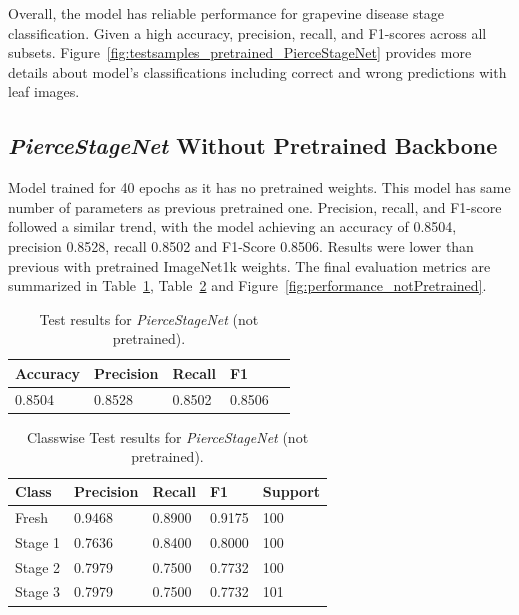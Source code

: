 \documentclass[conference]{IEEEtran}
\begin{document}
Overall, the model has reliable performance for grapevine disease stage classification. Given a high accuracy, precision, recall, and F1-scores across all subsets. Figure~\ref{fig:testsamples_pretrained_PierceStageNet} provides more details about model's classifications including correct and wrong predictions with leaf images.

\subsection{\textit{PierceStageNet} Without Pretrained Backbone}
Model trained for 40 epochs as it has no pretrained weights. This model has same number of parameters as previous pretrained one. Precision, recall, and F1-score followed a similar trend, with the model achieving an accuracy of 0.8504, precision 0.8528, recall 0.8502 and F1-Score 0.8506. Results were lower than previous with pretrained ImageNet1k weights. The final evaluation metrics are summarized in Table~\ref{tab:PierceStageNet_notPretrained_metrics}, Table~\ref{tab:PierceStageNet_notPretrained_class_metrics} and Figure~\ref{fig:performance_notPretrained}.

\begin{table}[H]
	\caption{Test results for \textit{PierceStageNet} (not pretrained).}
	\centering
	\begin{tabular}{m{} m{} m{} m{} m{}}
		\toprule
		\textbf{Accuracy} & \textbf{Precision} & \textbf{Recall} & \textbf{F1} \\
		\midrule
		0.8504     & 0.8528   & 0.8502   & 0.8506    \\
		\bottomrule
	\end{tabular}
	\label{tab:PierceStageNet_notPretrained_metrics}
\end{table}

\begin{table}[H]
	\caption{Classwise Test results for \textit{PierceStageNet} (not pretrained).}
	\centering
	\begin{tabular}{m{} m{} m{} m{} m{}}
		\toprule
		\textbf{Class} & \textbf{Precision} & \textbf{Recall} & \textbf{F1} & \textbf{Support} \\
		\midrule
		Fresh     & 0.9468    & 0.8900    & 0.9175    & 100         \\
		Stage 1   & 0.7636    & 0.8400    & 0.8000    & 100         \\
		Stage 2   & 0.7979    & 0.7500    & 0.7732    & 100          \\
		Stage 3   & 0.7979    & 0.7500    & 0.7732    & 101          \\
		\bottomrule
	\end{tabular}
	\label{tab:PierceStageNet_notPretrained_class_metrics}
\end{table}
\end{document}
